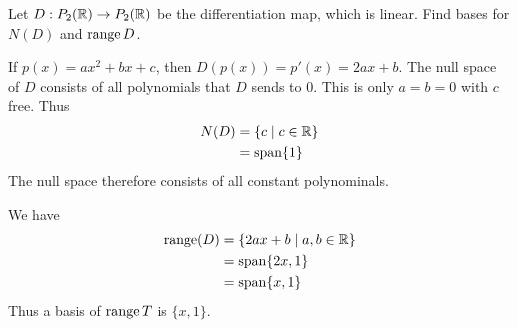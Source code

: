 \documentclass{article}
\DeclareMathOperator{\spn}{span}
\begin{document}
\begin{example}
  Let $D: P_2(\mathbb{R}) \to P_2(\mathbb{R})$ be the differentiation map, which is linear. Find bases for $N(D)$ and $\operatorname{\text{range}} D$.

  If $p(x) = ax^2 + bx + c$, then $D(p(x)) = p'(x) = 2ax + b$. The null space of $D$ consists of all polynomials that $D$ sends to $0$. This is only $a= b = 0$ with $c$ free. Thus
  \begin{align*}
    N(D) & = \{c \mid c \in \R\} \\
         & = \spn \{1\}
  \end{align*}
  The null space therefore consists of all constant polynominals.

  We have
  \begin{align*}
    \range(D) & = \{2ax + b \mid a, b \in \R\} \\
              & = \spn \{2x, 1\}               \\
              & = \spn \{x, 1\}                \\
  \end{align*}
  Thus a basis of $\operatorname{\text{range}} T$ is $\{x, 1\}$.
\end{example}
\end{document}
